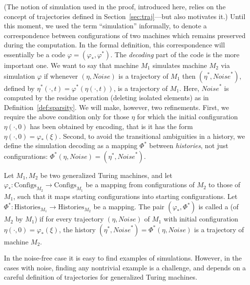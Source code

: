 \documentclass[11pt]{memoir}
\theoremstyle{definition} %
\newcommand{\Configs}{\mathrm{Configs}}
\newcommand{\Noise}{\mathit{Noise}}
\newcommand{\Histories}{\mathrm{Histories}}
\begin{document}
 (The notion of simulation used in the proof, introduced here,
 relies on the concept of trajectories defined in Section~\ref{sec:traj}---but also motivates it.)
Until this moment, we used the term ``simulation'' informally, to denote
a correspondence between configurations of
two machines which remains preserved during the computation.
In the formal definition, this correspondence will essentially be a code
\( \varphi=(\varphi_{*},\varphi^{*}) \).
The \emph{decoding} part of the code is the more important one.
We want to say that machine \( M_{1} \) simulates machine \( M_{2} \) via
simulation \( \varphi \) if whenever \( (\eta, \Noise) \) is a trajectory of \( M_{1} \) 
then \( (\eta^{*},\Noise^{*}) \),
defined by \( \eta^{*}(\cdot,t)=\varphi^{*}(\eta(\cdot,t)) \), is a
trajectory of \( M_{1} \).
Here, \( \Noise^{*} \) is computed by the residue operation (deleting isolated elements)
as in Definition~\ref{def:sparsity}.
We will make, however, two refinements.
First, we require the above condition only for
those \( \eta \) for which the initial configuration
 \( \eta(\cdot,0) \) has been obtained by encoding, that is it has the form 
\( \eta(\cdot,0)=\varphi_{*}(\xi) \).
Second, to avoid the transitional ambiguities in a history,
we define the simulation decoding as a mapping \( \Phi^{*} \)
between \emph{histories}, not just configurations:
\( \Phi^{*}(\eta,\Noise)=(\eta^{*},\Noise^{*}) \).

\begin{sloppypar}
\begin{definition}[Simulation] \label{def:simulation-central}
  Let \( M_{1},M_{2} \) be two generalized Turing machines, and let
  \( 
    \varphi_{*}:\Configs_{M_{2}} \to \Configs_{M_{1}} \)
be a mapping from configurations of \( M_{2} \) to those of \( M_{1} \), such that it maps
starting configurations into starting configurations.
Let \(    \Phi^{*}:\Histories_{M_{1}} \to \Histories_{M_{2}} \) be a mapping.
The pair \( (\varphi_{*}, \Phi^{*})  \)
is called a  (of \(  M_{2}  \) by \(  M_{1}  \)) if for every
trajectory \(  (\eta, \Noise)  \) of \( M_{1} \) with initial
configuration \(  \eta(\cdot,0)=\varphi_{*}(\xi)  \),
the history \(  (\eta^{*},\Noise^{*})=\Phi^{*}(\eta,\Noise)  \) is
a trajectory of machine \(  M_{2}  \).
\end{definition}
  \end{sloppypar}

In the noise-free case it is easy to find examples of simulations.
However, in the cases with noise, finding any nontrivial example 
is a challenge, and depends on a careful definition of trajectories for generalized Turing machines.
\end{document}
